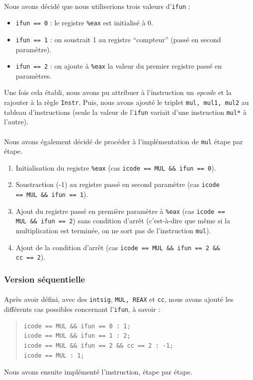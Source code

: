 \documentclass[12pt]{article}
\begin{document}
\paragraph{}Nous avons décidé que nous utiliserions trois valeurs d'\verb+ifun+ :
\begin{itemize}
\item \verb+ifun == 0+ : le registre \verb+%eax+ est initialisé à 0.
\item \verb+ifun == 1+ : on soustrait 1 au registre ``compteur'' (passé en second paramètre).
\item \verb+ifun == 2+ : on ajoute à \verb+%eax+ la valeur du premier registre passé en paramètres.
\end{itemize}
Une fois cela établi, nous avons pu attribuer à l'instruction un {\itshape opcode} et la rajouter à la règle \verb+Instr+. Puis, nous avons ajouté le triplet \verb+mul, mul1, mul2+ au tableau d'instructions (seule la valeur de l'\verb+ifun+ variait d'une instruction \verb+mul*+ à l'autre).

\paragraph{}Nous avons également décidé de procéder à l'implémentation de \verb+mul+ étape par étape.
\begin{enumerate}
\item Initialisation du registre \verb+%eax+ (cas \verb+icode == MUL && ifun == 0+).
\item Soustraction (-1) au registre passé en second paramètre (cas \verb+icode+
  \\\verb+== MUL && ifun == 1+).
\item Ajout du registre passé en première paramètre à \verb+%eax+ (cas \verb+icode ==+
  \\\verb+MUL && ifun == 2+) sans condition d'arrêt (c'est-à-dire que même si la multiplication est terminée, on ne sort pas de l'instruction \verb+mul+).
\item Ajout de la condition d'arrêt (cas \verb+icode == MUL && ifun == 2 &&+
  \\\verb+cc == 2+).
\end{enumerate}

\subsubsection{Version séquentielle}
\paragraph{}Après avoir défini, avec des \verb+intsig+, \verb+MUL, REAX+ et \verb+cc+, nous avons ajouté les différents cas possibles concernant l'\verb+ifun+, à savoir :
\begin{quote}
\begin{verbatim}
icode == MUL && ifun == 0 : 1;
icode == MUL && ifun == 1 : 2;
icode == MUL && ifun == 2 && cc == 2 : -1;
icode == MUL : 1;
\end{verbatim}
\end{quote}
Nous avons ensuite implémenté l'instruction, étape par étape.
\end{document}
